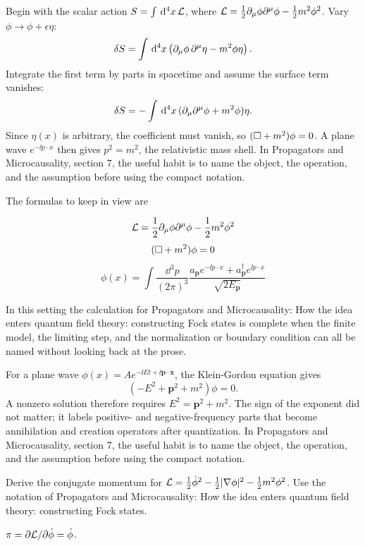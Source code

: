 Begin with the scalar action \(S=\int\,\mathrm d^4x\,\mathcal L\), where \(\mathcal L=\frac12\partial_\mu\phi\partial^\mu\phi-\frac12m^2\phi^2\).  Vary \(\phi\to\phi+\epsilon\eta\):
\[
  \delta S=\int\,\mathrm d^4x\left(\partial_\mu\phi\,\partial^\mu\eta-m^2\phi\eta\right).
\]
Integrate the first term by parts in spacetime and assume the surface term vanishes:
\[
  \delta S=-\int\,\mathrm d^4x\,(\partial_\mu\partial^\mu\phi+m^2\phi)\eta.
\]
Since \(\eta(x)\) is arbitrary, the coefficient must vanish, so \((\Box+m^2)\phi=0\).  A plane wave \(e^{-\ii p\cdot x}\) then gives \(p^2=m^2\), the relativistic mass shell.  In Propagators and Microcausality, section 7, the useful habit is to name the object, the operation, and the assumption before using the compact notation.

The formulas to keep in view are

\[
  \mathcal L=\frac12\partial_\mu\phi\partial^\mu\phi-\frac12m^2\phi^2
\]
\[
  (\Box+m^2)\phi=0
\]
\[
  \phi(x)=\int\frac{\dd^3p}{(2\pi)^3}\frac{a_{\bm p}e^{-\ii p\cdot x}+a_{\bm p}^\dagger e^{\ii p\cdot x}}{\sqrt{2E_{\bm p}}}
\]

In this setting the calculation for Propagators and Microcausality: How the idea enters quantum field theory: constructing Fock states is complete when the finite model, the limiting step, and the normalization or boundary condition can all be named without looking back at the prose.




\begin{example}
For a plane wave \(\phi(x)=Ae^{-\ii Et+\ii\bm p\cdot\bm x}\), the Klein-Gordon equation gives
\[
  (-E^2+\bm p^2+m^2)\phi=0.
\]
A nonzero solution therefore requires \(E^2=\bm p^2+m^2\).  The sign of the exponent did not matter; it labels positive- and negative-frequency parts that become annihilation and creation operators after quantization.  In Propagators and Microcausality, section 7, the useful habit is to name the object, the operation, and the assumption before using the compact notation.
\end{example}



\begin{exercise}
Derive the conjugate momentum for \(\mathcal L=\frac12\dot\phi^2-\frac12|\nabla\phi|^2-\frac12m^2\phi^2\).  Use the notation of Propagators and Microcausality: How the idea enters quantum field theory: constructing Fock states.
\begin{answer}
\(\pi=\partial\mathcal L/\partial\dot\phi=\dot\phi\).
\end{answer}
\end{exercise}

